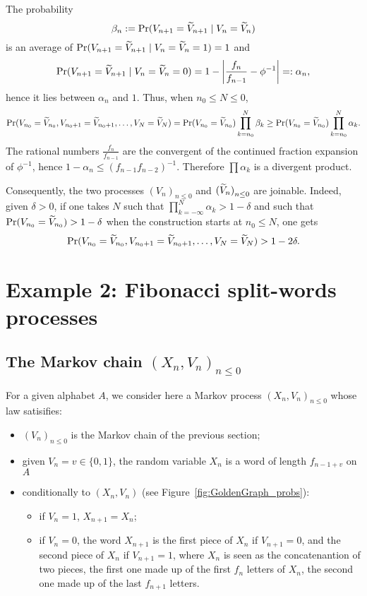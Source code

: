\documentclass[12pt,a4paper]{article}
\begin{document}
The probability 
$$
\beta_n:=\Pr(V_{n+1} = \widetilde{V}_{n+1} \mid V_{n}=\widetilde{V}_{n})
$$
is an average of 
$\Pr(V_{n+1} = \widetilde{V}_{n+1} \mid V_{n}=\widetilde{V}_{n}=1)  = 1$ and 
$$
\Pr(V_{n+1} = \widetilde{V}_{n+1} \mid V_{n}=\widetilde{V}_{n}=0) 
= 1 - \left|\frac{f_n}{f_{n-1}} - \phi^{-1}\right| =: \alpha_n, 
$$
hence it lies between $\alpha_n$ and $1$. 
Thus, when $n_0 \leq N \leq 0$, 
$$
\Pr(V_{n_0} = \widetilde{V}_{n_0}, V_{n_0+1} = \widetilde{V}_{n_0+1}, \ldots, V_{N} = \widetilde{V}_{N}) = 
\Pr(V_{n_0} = \widetilde{V}_{n_0}) \prod_{k={n_0}}^N \beta_k 
\geq \Pr(V_{n_0} = \widetilde{V}_{n_0}) \prod_{k={n_0}}^N \alpha_k.
$$
The rational numbers $\frac{f_n}{f_{n-1}}$ are the convergent of the continued fraction 
expansion of $\phi^{-1}$, hence $1 - \alpha_n \leq {(f_{n-1}f_{n-2})}^{-1}$. 
Therefore $\prod \alpha_k$ is a divergent product.

Consequently, the two processes ${(V_n)}_{n \leq 0}$ and ${(\widetilde{V}_n)}_{n \leq 0}$ 
are joinable. Indeed, given $\delta>0$, if one takes $N$ such that 
$\prod_{k={-\infty}}^N \alpha_k > 1 - \delta$ and such that 
$\Pr(V_{n_0} = \widetilde{V}_{n_0}) > 1-\delta$ when the construction starts at 
$n_0 \leq N$, one gets 
$$
\Pr(V_{n_0} = \widetilde{V}_{n_0}, V_{n_0+1} = \widetilde{V}_{n_0+1}, \ldots, V_{N} = \widetilde{V}_{N}) > 1-2\delta.
$$


\section{Example 2: Fibonacci split-words processes} 


\subsection{The Markov chain ${(X_n, V_n)}_{n \leq 0}$}

For a given alphabet $A$, we consider here 
a Markov process ${(X_n, V_n)}_{n \leq 0}$ whose law satisifies:

\begin{itemize}
\item ${(V_n)}_{n \leq 0}$ is the Markov chain of the previous section; 

\item given $V_n = v \in \{0,1\}$, the random variable $X_n$ is a word of length 
$f_{n-1+v}$ on $A$ 

\item conditionally to $(X_n,V_n)$ (see Figure~\ref{fig:GoldenGraph_probs}):
\begin{itemize}
\item if $V_n=1$, $X_{n+1}=X_n$;

\item if $V_n=0$, the word $X_{n+1}$ is the first piece of $X_n$ 
if $V_{n+1}=0$, and the second piece of $X_n$ if $V_{n+1}=1$, 
where $X_n$ is seen as the concatenantion of two pieces, the 
first one made up of the first $f_n$ letters of $X_n$, the second 
one made up of the last $f_{n+1}$ letters. 
\end{itemize}
\end{itemize}
\end{document}
